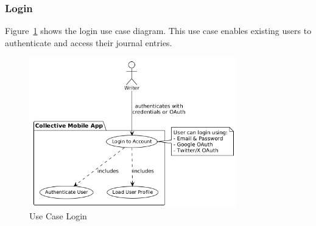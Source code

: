 \subsubsection{Login}

Figure~\ref{fig:usecase-login} shows the login use case diagram. This use case enables existing users to authenticate and access their journal entries.

\begin{figure}[H]
\centering
\includegraphics[width=0.8\textwidth]{files/imgs/usecase_U9ojKZrFmp.png}
\caption{Use Case Login}
\label{fig:usecase-login}
\end{figure}

